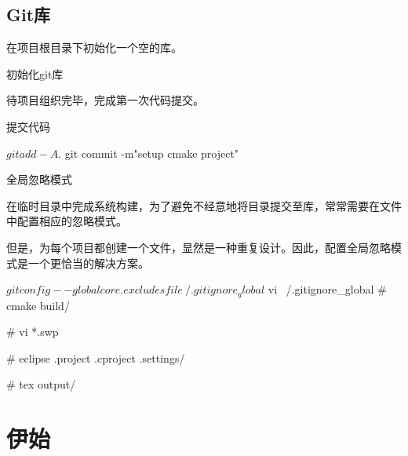 \begin{content}
\subsection{Git库}

在项目根目录下初始化一个空的库。

\begin{nodiff}{初始化git库}
\end{nodiff}  

待项目组织完毕，完成第一次代码提交。

\begin{nodiff}{提交代码}
 \begin{c++}
$ git add -A .
$ git commit -m"setup cmake project"
 \end{c++}
\end{nodiff}

\begin{episode}{全局忽略模式}
\begin{content}

在临时目录中完成系统构建，为了避免不经意地将目录提交至库，常常需要在文件中配置相应的忽略模式。

但是，为每个项目都创建一个文件，显然是一种重复设计。因此，配置全局忽略模式是一个更恰当的解决方案。

 \begin{c++}
$ git config --global core.excludesfile ~/.gitignore_global
$ vi ~/.gitignore_global
# cmake
build/

# vi
*.swp

# eclipse
.project
.cproject
.settings/

# tex
output/
 \end{c++}

\end{content}
\end{episode}

\end{content}

\section{伊始}

